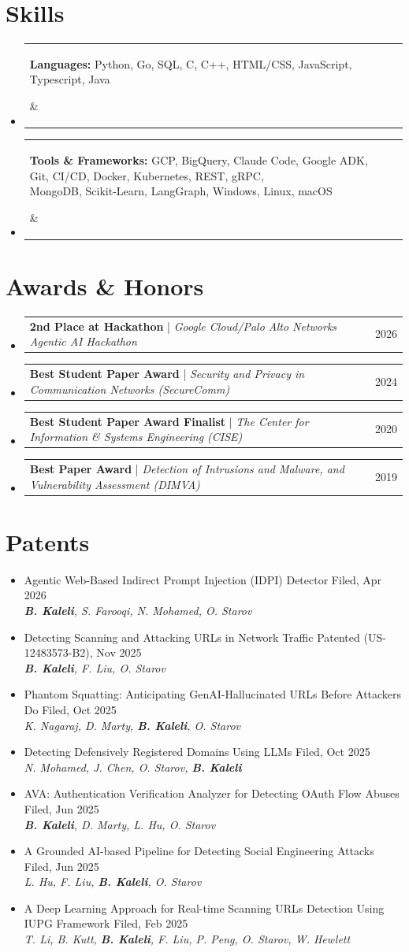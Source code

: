 \documentclass[letterpaper,11pt]{article}
\makeatletter
\newcommand{\resumeProjectHeading}[2]{
    \item
    \begin{tabular*}{1.0\textwidth}{l@{\extracolsep{\fill}}r}
      \small\parbox[t]{0.95\textwidth}{#1} & {\small #2}\\     
    \end{tabular*}\vspace{-9pt}
}
\newcommand{\resumeAwardHeading}[3]{
    \item
    \begin{tabular*}{1.0\textwidth}{l@{\extracolsep{\fill}}r}
      \textbf{\small #1} | \textit{\small #2} & {\small #3}\\
    \end{tabular*}\vspace{-9pt}
}
\newcommand{\resumePatentHeading}[3]{
    \item {\small #1} \hfill {\small #2}\\
    \textit{\small #3}\vspace{-11pt}
}
\newcommand{\resumeSubHeadingListStart}{\begin{itemize}[leftmargin=0.0in, label={}]}
\newcommand{\resumeSubHeadingListEnd}{\end{itemize}}
\newcommand{\resumeItemListStart}{\begin{itemize}[leftmargin=0.15in, label={$\bullet$}, topsep=0pt]}
\newcommand{\resumeItemListEnd}{\end{itemize}}
\makeatother
\begin{document}
\section{Skills}
  \resumeSubHeadingListStart
    \resumeProjectHeading
      {\textbf{Languages:} Python, Go, SQL, C, C++, HTML/CSS, JavaScript, Typescript, Java}{}
    \resumeProjectHeading
      {\textbf{Tools \& Frameworks:} GCP, BigQuery, Claude Code, Google ADK, Git, CI/CD, Docker, Kubernetes, REST, gRPC, \\ MongoDB, Scikit-Learn, LangGraph, Windows, Linux, macOS}{}
  \resumeSubHeadingListEnd
\vspace{0.01in}

\section{Awards \& Honors}
  \resumeSubHeadingListStart
    \resumeAwardHeading
      {2nd Place at Hackathon}
      {Google Cloud/Palo Alto Networks Agentic AI Hackathon}
      {2026}
    \resumeAwardHeading
      {Best Student Paper Award}
      {Security and Privacy in Communication Networks (SecureComm)}
      {2024}     
    \resumeAwardHeading
      {Best Student Paper Award Finalist}
      {The Center for Information \& Systems Engineering (CISE)}
      {2020}
    \resumeAwardHeading
      {Best Paper Award}
      {Detection of Intrusions and Malware, and Vulnerability Assessment (DIMVA)}
      {2019}     
  \resumeSubHeadingListEnd
\vspace{0.01in}

\section{Patents}
  \resumeItemListStart
    \resumePatentHeading
        {Agentic Web-Based Indirect Prompt Injection (IDPI) Detector}
        {Filed, Apr 2026}
        {\textbf{B. Kaleli}, S. Farooqi, N. Mohamed, O. Starov}
    \resumePatentHeading
        {Detecting Scanning and Attacking URLs in Network Traffic}{Patented (US-12483573-B2), Nov 2025}
        {\textbf{B. Kaleli}, F. Liu, O. Starov}
    \resumePatentHeading
        {Phantom Squatting: Anticipating GenAI-Hallucinated URLs Before Attackers Do}{Filed, Oct 2025}
        {K. Nagaraj, D. Marty, \textbf{B. Kaleli}, O. Starov}
    \resumePatentHeading
        {Detecting Defensively Registered Domains Using LLMs}
        {Filed, Oct 2025}
        {N. Mohamed, J. Chen, O. Starov, \textbf{B. Kaleli}}
    \resumePatentHeading
        {AVA: Authentication Verification Analyzer for Detecting OAuth Flow Abuses}{Filed, Jun 2025}
        {\textbf{B. Kaleli}, D. Marty, L. Hu, O. Starov}
    \resumePatentHeading
        {A Grounded AI-based Pipeline for Detecting Social Engineering Attacks}
        {Filed, Jun 2025}
        {L. Hu, F. Liu, \textbf{B. Kaleli}, O. Starov}
    \resumePatentHeading
        {A Deep Learning Approach for Real-time Scanning URLs Detection Using IUPG Framework}
        {Filed, Feb 2025}
        {T. Li, B. Kutt, \textbf{B. Kaleli}, F. Liu, P. Peng, O. Starov, W. Hewlett}
  \resumeItemListEnd
\vspace{0.01in}
\end{document}
